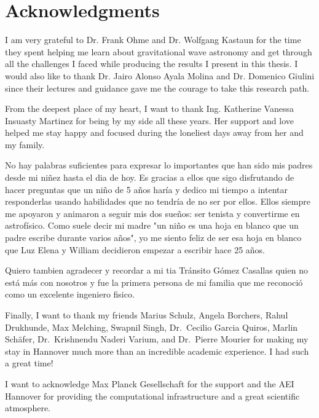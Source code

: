 \chapter{Acknowledgments}

I am very grateful to Dr. Frank Ohme and Dr. Wolfgang Kastaun for the time they spent helping me learn about gravitational wave astronomy and get through all the challenges I faced while producing the results I present in this thesis. I would also like to thank Dr. Jairo Alonso Ayala Molina and Dr. Domenico Giulini since their lectures and guidance gave me the courage to take this research path.

From the deepest place of my heart, I want to thank Ing. Katherine Vanessa Insuasty Martinez for being by my side all these years. Her support and love helped me stay happy and focused during the loneliest days away from her and my family.

No hay palabras suficientes para expresar lo importantes que han sido mis padres desde mi niñez hasta el dia de hoy. Es gracias a ellos que sigo disfrutando de hacer preguntas que un niño de 5 años haría y dedico mi tiempo a intentar responderlas usando habilidades que no tendría de no ser por ellos. Ellos siempre me apoyaron y animaron a seguir mis dos sueños: ser tenista y convertirme en astrofísico. Como suele decir mi madre "un niño es una hoja en blanco que un padre escribe durante varios años", yo me siento feliz de ser esa hoja en blanco que Luz Elena y William decidieron empezar a escribir hace 25 años.

Quiero tambien agradecer y recordar a mi tia Tránsito Gómez Casallas quien no está más con nosotros y fue la primera persona de mi familia que me reconoció como un excelente ingeniero fisico.

Finally, I want to thank my friends Marius Schulz, Angela Borchers, Rahul Drukhunde, Max Melching, Swapnil Singh, Dr.~Cecilio Garcia Quiros, Marlin Schäfer, Dr.~Krishnendu Naderi Varium, and Dr.~Pierre Mourier for making my stay in Hannover much more than an incredible academic experience. I had such a great time!

I want to acknowledge Max Planck Gesellschaft for the support and the AEI Hannover for providing the computational infrastructure and a great scientific atmosphere.
